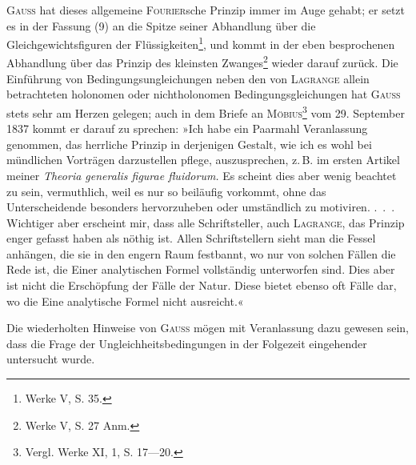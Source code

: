 \textsc{Gauss} hat dieses allgemeine \textsc{Fourier}sche Prinzip immer im Auge gehabt;
er setzt es in der Fassung (9) an die Spitze seiner Abhandlung über die Gleichgewichtsfiguren
der Flüssigkeiten\footnote{Werke V, S. 35.}, und kommt in der eben besprochenen
Abhandlung über das Prinzip des kleinsten Zwanges\footnote{Werke V, S. 27 Anm.} wieder darauf zurück.
Die Einführung von Bedingungsungleichungen neben den von \textsc{Lagrange} allein
betrachteten holonomen oder nichtholonomen Bedingungsgleichungen hat \textsc{Gauss}
stets sehr am Herzen gelegen; auch in dem Briefe an \textsc{Möbius}\footnote{Vergl. Werke XI, 1, S. 17—20.} vom 29. September
1837 kommt er darauf zu sprechen: »Ich habe ein Paarmahl Veranlassung
genommen, das herrliche Prinzip in derjenigen Gestalt, wie ich es
wohl bei mündlichen Vorträgen darzustellen pflege, auszusprechen, z.\,B. im
ersten Artikel meiner \textit{Theoria generalis figurae fluidorum.} Es scheint dies aber
wenig beachtet zu sein, vermuthlich, weil es nur so beiläufig vorkommt, ohne
das Unterscheidende besonders hervorzuheben oder umständlich zu motiviren.
.\, .\, . Wichtiger aber erscheint mir, dass alle Schriftsteller, auch \textsc{Lagrange}, das
Prinzip enger gefasst haben als nöthig ist. Allen Schriftstellern sieht man
die Fessel anhängen, die sie in den engern Raum festbannt, wo nur von
solchen Fällen die Rede ist, die Einer analytischen Formel vollständig unterworfen
sind. Dies aber ist nicht die Erschöpfung der Fälle der Natur. Diese
bietet ebenso oft Fälle dar, wo die Eine analytische Formel nicht ausreicht.«

Die wiederholten Hinweise von \textsc{Gauss} mögen mit Veranlassung dazu gewesen
sein, dass die Frage der Ungleichheitsbedingungen in der Folgezeit
eingehender untersucht wurde.

